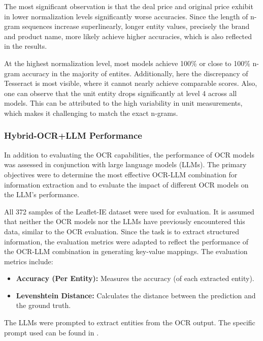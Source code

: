 \documentclass[11pt]{article}
\begin{document}
The most significant observation is that the deal price and original price exhibit in lower normalization levels significantly worse accuracies. Since the length of n-gram sequences increase superlinearly, longer entity values, precisely the brand and product name, more likely achieve higher accuracies, which is also reflected in the results.

At the highest normalization level, most models achieve 100\% or close to 100\% n-gram accuracy in the majority of entites. Additionally, here the discrepancy of Tesseract is most visible, where it cannot nearly achieve comparable scores. Also, one can observe that the unit entity drops significantly at level 4 across all models. This can be attributed to the high variability in unit measurements, which makes it challenging to match the exact n-grams.


\subsubsection{Hybrid-OCR+LLM Performance}

In addition to evaluating the OCR capabilities, the performance of OCR models was assessed in conjunction with large language models (LLMs). The primary objectives were to determine the most effective OCR-LLM combination for information extraction and to evaluate the impact of different OCR models on the LLM's performance.

All 372 samples of the Leaflet-IE dataset were used for evaluation. It is assumed that neither the OCR models nor the LLMs have previously encountered this data, similar to the OCR evaluation. Since the task is to extract structured information, the evaluation metrics were adapted to reflect the performance of the OCR-LLM combination in generating key-value mappings. The evaluation metrics include:
\begin{itemize}
    \item \textbf{Accuracy (Per Entity):} Measures the accuracy (of each extracted entity).
    \item \textbf{Levenshtein Distance:} Calculates the distance between the prediction and the ground truth.
\end{itemize}

The LLMs were prompted to extract entities from the OCR output. The specific prompt used can be found in .
\end{document}
